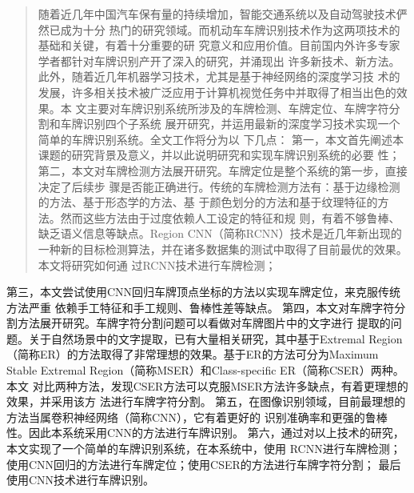 \begin{abstract}
随着近几年中国汽车保有量的持续增加，智能交通系统以及自动驾驶技术俨然已成为十分
热门的研究领域。而机动车车牌识别技术作为这两项技术的基础和关键，有着十分重要的研
究意义和应用价值。目前国内外许多专家学者都针对车牌识别产开了深入的研究，并涌现出
许多新技术、新方法。此外，随着近几年机器学习技术，尤其是基于神经网络的深度学习技
术的发展，许多相关技术被广泛应用于计算机视觉任务中并取得了相当出色的效果。本
文主要对车牌识别系统所涉及的车牌检测、车牌定位、车牌字符分割和车牌识别四个子系统
展开研究，并运用最新的深度学习技术实现一个简单的车牌识别系统。全文工作将分为以
下几点：
第一，本文首先阐述本课题的研究背景及意义，并以此说明研究和实现车牌识别系统的必要
性；
第二，本文对车牌检测方法展开研究。车牌定位是整个系统的第一步，直接决定了后续步
骤是否能正确进行。传统的车牌检测方法有：基于边缘检测的方法、基于形态学的方法、基
于颜色划分的方法和基于纹理特征的方法。然而这些方法由于过度依赖人工设定的特征和规
则，有着不够鲁棒、缺乏语义信息等缺点。Region CNN（简称RCNN）技术是近几年新出现的
一种新的目标检测算法，并在诸多数据集的测试中取得了目前最优的效果。本文将研究如何通
过RCNN技术进行车牌检测；
\end{abstract}
第三，本文尝试使用CNN回归车牌顶点坐标的方法以实现车牌定位，来克服传统方法严重
依赖手工特征和手工规则、鲁棒性差等缺点。
第四，本文对车牌字符分割方法展开研究。车牌字符分割问题可以看做对车牌图片中的文字进行
提取的问题。关于自然场景中的文字提取，已有大量相关研究，其中基于Extremal Region
（简称ER）的方法取得了非常理想的效果。基于ER的方法可分为Maximum Stable
Extremal Region（简称MSER）和Class-specific ER（简称CSER）两种。本文
对比两种方法，发现CSER方法可以克服MSER方法许多缺点，有着更理想的效果，并采用该方
法进行车牌字符分割。
第五，在图像识别领域，目前最理想的方法当属卷积神经网络（简称CNN），它有着更好的
识别准确率和更强的鲁棒性。因此本系统采用CNN的方法进行车牌识别。
第六，通过对以上技术的研究，本文实现了一个简单的车牌识别系统，在本系统中，使用
RCNN进行车牌检测；使用CNN回归的方法进行车牌定位；使用CSER的方法进行车牌字符分割；
最后使用CNN技术进行车牌识别。


